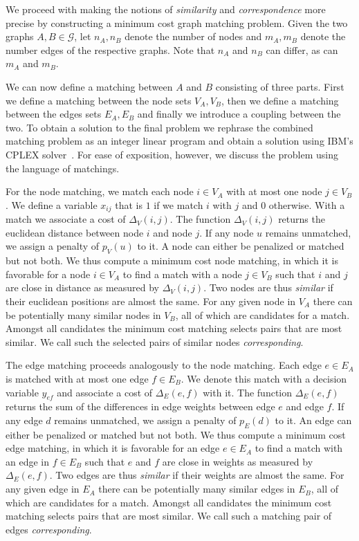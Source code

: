 		We proceed with making the notions of \emph{similarity} and \emph{correspondence} more precise by constructing a minimum cost graph matching problem. Given the two graphs $A,B \in \mathcal{G}$, let $n_A,n_B$ denote the number of nodes and $m_A,m_B$ denote the number edges of the respective graphs. Note that $n_A$ and $n_B$ can differ, as can $m_A$ and $m_B$.

		We can now define a matching between $A$ and $B$ consisting of three parts. First we define a matching between the node sets $V_A, V_B$, then we define a matching between the edges sets $E_A, E_B$ and finally we introduce a coupling between the two. To obtain a solution to the final problem we rephrase the combined matching problem as an integer linear program and obtain a solution using IBM's CPLEX solver~\cite{cplex2009v12}. For ease of exposition, however, we discuss the problem using the language of matchings.

		For the node matching, we match each node $i \in V_A$ with at most one node $j \in V_B$. We define a variable $x_{ij}$ that is $1$ if we match $i$ with $j$ and $0$ otherwise. With a match we associate a cost of $\Delta_V(i,j)$. The function $\Delta_V(i,j)$ returns the euclidean distance between node $i$ and node $j$. If any node $u$ remains unmatched, we assign a penalty of $p_V(u)$ to it. A node can either be penalized or matched but not both. We thus compute a minimum cost node matching, in which it is favorable for a node $i \in V_A$ to find a match with a node $j \in V_B$ such that $i$ and $j$ are close in distance as measured by $\Delta_V(i,j)$. Two nodes are thus \emph{similar} if their euclidean positions are almost the same. For any given node in $V_A$ there can be potentially many similar nodes in $V_B$, all of which are candidates for a match. Amongst all candidates the minimum cost matching selects pairs that are most similar. We call such the selected pairs of similar nodes \emph{corresponding}.

		The edge matching proceeds analogously to the node matching. Each edge $e \in E_A$ is matched with at most one edge $f \in E_B$. We denote this match with a decision variable $y_{ef}$ and associate a cost of $\Delta_E(e,f)$ with it. The function $\Delta_E(e,f)$ returns the sum of the differences in edge weights between edge $e$ and edge $f$. If any edge $d$ remains unmatched, we assign a penalty of $p_E(d)$ to it. An edge can either be penalized or matched but not both. We thus compute a minimum cost edge matching, in which it is favorable for an edge $e \in E_A$ to find a match with an edge in $f \in E_B$ such that $e$ and $f$ are close in weights as measured by $\Delta_E(e,f)$. Two edges are thus \emph{similar} if their weights are almost the same. For any given edge in $E_A$ there can be potentially many similar edges in $E_B$, all of which are candidates for a match. Amongst all candidates the minimum cost matching selects pairs that are most similar. We call such a matching pair of edges \emph{corresponding}.

